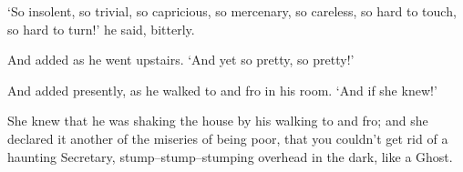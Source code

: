 ‘So insolent, so trivial, so capricious, so mercenary, so careless, so
hard to touch, so hard to turn!’ he said, bitterly.

And added as he went upstairs. ‘And yet so pretty, so pretty!’

And added presently, as he walked to and fro in his room. ‘And if she
knew!’

She knew that he was shaking the house by his walking to and fro; and
she declared it another of the miseries of being poor, that you couldn’t
get rid of a haunting Secretary, stump--stump--stumping overhead in the
dark, like a Ghost.



